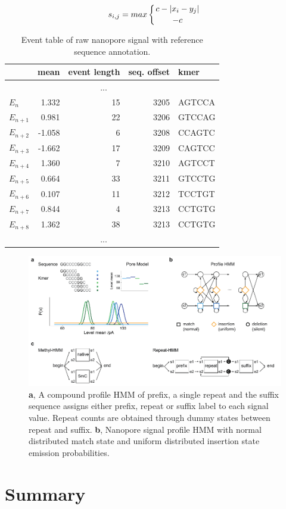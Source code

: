 \begin{equation}
s_{i,j} = max \left\lbrace c - \left| x_{i} - y_{j} \right| \atop -c \right.
\end{equation}

\begin{table}[ht]
	\centering
	\caption[Event detection and annotation]{Event table of raw nanopore signal with reference sequence annotation.}
	\label{tab:signal:events}
	\begin{tabular}{l|r|r|r|l}
		 & mean & event length & seq. offset & kmer \\
		\hline 
		& \multicolumn{3}{c|}{...} &  \\
		\hline
		$ E_{n} $ &  1.332  & 15 & 3205 & AGTCCA \\
		\rowcolor{LightOrange}
		$ E_{n+1} $ &  0.981  & 22 & 3206 & GTCCAG \\
		$ E_{n+2} $ & -1.058  &  6 & 3208 & CCAGTC \\
		$ E_{n+3} $ & -1.662  & 17 & 3209 & CAGTCC \\
		$ E_{n+4} $ &  1.360  &  7 & 3210 & AGTCCT \\
		$ E_{n+5} $ &  0.664  & 33 & 3211 & GTCCTG \\
		$ E_{n+6} $ &  0.107  & 11 & 3212 & TCCTGT \\
		\rowcolor{LightGreen}
		$ E_{n+7} $ &  0.844  &  4 & 3213 & CCTGTG \\
		\rowcolor{LightGreen}
		$ E_{n+8} $ &  1.362  & 38 & 3213 & CCTGTG \\
		\hline
		& \multicolumn{3}{c|}{...} &  \\
	\end{tabular} 
\end{table}


\cite{Schreiber2015}

\begin{figure}[h]
	\centering
	\includegraphics[width=1.0\textwidth]{figures/signal/count_hmm.pdf}
	\captionsetup{format=plain}
	\caption[Nanopore signal alignment with HMMs]{\textbf{a}, A compound profile HMM of prefix, a single repeat and the suffix sequence assigns either prefix, repeat or suffix label to each signal value. Repeat counts are obtained through dummy states between repeat and suffix. \textbf{b}, Nanopore signal profile HMM with normal distributed match state and uniform distributed insertion state emission probabilities.}
	\label{fig:strique:count_hmm}
\end{figure}




\section{Summary}
\label{sec:signal:summary}



